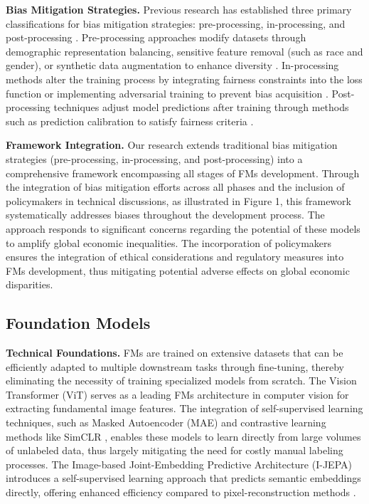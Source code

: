 \textbf{Bias Mitigation Strategies.} Previous research has established three primary classifications for bias mitigation strategies: pre-processing, in-processing, and post-processing \cite{du_fairness_2021, chen_algorithmic_2023, mehrabi_survey_2021, xu_addressing_2024}. Pre-processing approaches modify datasets through demographic representation balancing, sensitive feature removal (such as race and gender), or synthetic data augmentation to enhance diversity \cite{burlina_addressing_2021, noseworthy_assessing_2020, calmon_optimized_2017}. In-processing methods alter the training process by integrating fairness constraints into the loss function or implementing adversarial training to prevent bias acquisition \cite{celis_improved_2019, wissel_investigation_2019, zafar_fairness_2017}. Post-processing techniques adjust model predictions after training through methods such as prediction calibration to satisfy fairness criteria \cite{Kamishima_Fairness-Aware_2012, pleiss_fairness_2017, chouldechova_case_2018}.

\textbf{Framework Integration.} Our research extends traditional bias mitigation strategies (pre-processing, in-processing, and post-processing) into a comprehensive framework encompassing all stages of FMs development. Through the integration of bias mitigation efforts across all phases and the inclusion of policymakers in technical discussions, as illustrated in Figure 1, this framework systematically addresses biases throughout the development process. The approach responds to significant concerns regarding the potential of these models to amplify global economic inequalities. The incorporation of policymakers ensures the integration of ethical considerations and regulatory measures into FMs development, thus mitigating potential adverse effects on global economic disparities.

\subsection{Foundation Models}

\textbf{Technical Foundations.} FMs are trained on extensive datasets that can be efficiently adapted to multiple downstream tasks through fine-tuning, thereby eliminating the necessity of training specialized models from scratch. The Vision Transformer (ViT) \cite{dosovitskiy_image_2021} serves as a leading FMs architecture in computer vision for extracting fundamental image features. The integration of self-supervised learning techniques, such as Masked Autoencoder (MAE) \cite{he_masked_2021} and contrastive learning methods like SimCLR \cite{chen_simple_2020}, enables these models to learn directly from large volumes of unlabeled data, thus largely mitigating the need for costly manual labeling processes. The Image-based Joint-Embedding Predictive Architecture (I-JEPA) introduces a self-supervised learning approach that predicts semantic embeddings directly, offering enhanced efficiency compared to pixel-reconstruction methods \cite{assran_self-supervised_2023}.

